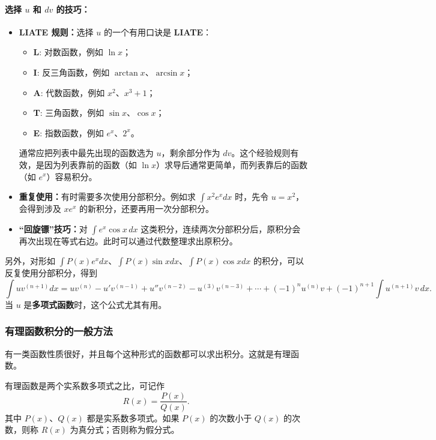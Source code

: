 \paragraph*{选择 $u$ 和 $dv$ 的技巧：}
\begin{itemize}
    \item \textbf{LIATE 规则：}选择 $u$ 的一个有用口诀是 \textbf{LIATE}：
    \begin{itemize}
        \item \textbf{L}: 对数函数，例如 $\ln x$；
        \item \textbf{I}: 反三角函数，例如 $\arctan x$、$\arcsin x$；
        \item \textbf{A}: 代数函数，例如 $x^2$、$x^3+1$；
        \item \textbf{T}: 三角函数，例如 $\sin x$、$\cos x$；
        \item \textbf{E}: 指数函数，例如 $e^x$、$2^x$。
    \end{itemize}
    通常应把列表中最先出现的函数选为 $u$，剩余部分作为 $dv$。这个经验规则有效，是因为列表靠前的函数（如 $\ln x$）求导后通常更简单，而列表靠后的函数（如 $e^x$）容易积分。
    \item \textbf{重复使用：}有时需要多次使用分部积分。例如求 $\int x^2e^x dx$ 时，先令 $u=x^2$，会得到涉及 $xe^x$ 的新积分，还要再用一次分部积分。
    \item \textbf{“回旋镖”技巧：}对 $\int e^x\cos x\,dx$ 这类积分，连续两次分部积分后，原积分会再次出现在等式右边。此时可以通过代数整理求出原积分。
\end{itemize}

另外，对形如 $\int P(x)e^x dx$、$\int P(x)\sin x dx$、$\int P(x)\cos x dx$ 的积分，可以反复使用分部积分，得到
\[
\int u v^{(n+1)}dx=uv^{(n)}-u'v^{(n-1)}+u''v^{(n-2)}-u^{(3)}v^{(n-3)}+\cdots+(-1)^n u^{(n)}v+(-1)^{n+1}\int u^{(n+1)}v\,dx.
\]
当 $u$ 是\textbf{多项式函数}时，这个公式尤其有用。

\subsubsection{有理函数积分的一般方法}

有一类函数性质很好，并且每个这种形式的函数都可以求出积分。这就是有理函数。

\begin{definition}[有理函数]
有理函数是两个实系数多项式之比，可记作
\[
R(x)=\frac{P(x)}{Q(x)}.
\]
其中 $P(x)$、$Q(x)$ 都是实系数多项式。如果 $P(x)$ 的次数小于 $Q(x)$ 的次数，则称 $R(x)$ 为真分式；否则称为假分式。
\end{definition}

